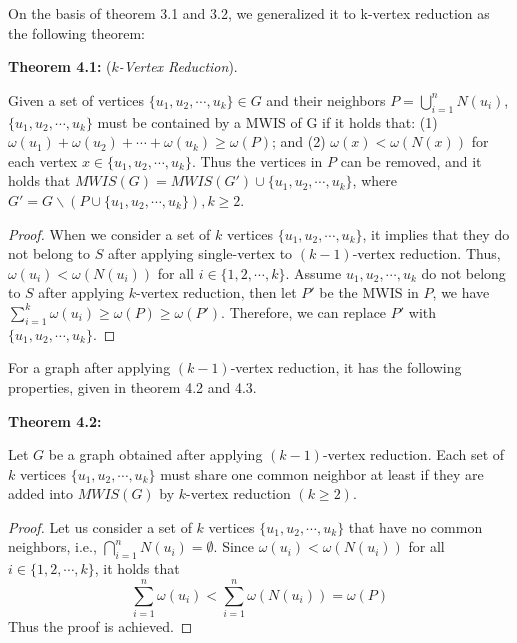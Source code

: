 \documentclass[sigconf, nonacm]{acmart}
\begin{document}
On the basis of theorem 3.1 and 3.2, we generalized it to k-vertex reduction as the following theorem:

\begin{framed}
\noindent\textbf{Theorem 4.1:} (\emph{$k$-Vertex Reduction}). 

Given a  set of vertices $\{u_1, u_2, \cdots, u_k\}\in G$ and their neighbors $P=\bigcup_{i=1}^nN(u_i)$, $\{u_1, u_2, \cdots, u_k\}$ must be contained by a MWIS of G if it holds that: (1) $\omega(u_1) + \omega(u_2) + \cdots + \omega(u_k) \geq \omega(P)$; and (2) $\omega(x) < \omega(N(x))$ for each vertex $x\in\{u_1, u_2, \cdots, u_k\}$. Thus the vertices in $P$ can be removed, and it holds that $MWIS(G) = MWIS(G')\cup\{u_1, u_2, \cdots, u_k\}$, where $G'=G\backslash (P\cup\{u_1, u_2, \cdots, u_k\}), k \geq 2$.
\end{framed}

\begin{proof}
When we consider a set of $k$ vertices $\{u_1, u_2, \cdots, u_k\}$, it implies that they do not belong to $S$ after applying single-vertex to $(k-1)$-vertex reduction. Thus, $\omega(u_i)<\omega(N(u_i))$ for all $i\in\{1,2,\cdots,k\}$. Assume $u_1, u_2, \cdots, u_k$ do not belong to $S$ after applying $k$-vertex reduction, then let $P'$ be the MWIS in $P$, we have $\sum_{i=1}^k\omega(u_i)\geq\omega(P)\geq\omega(P')$. Therefore, we can replace $P'$ with $\{u_1, u_2, \cdots, u_k\}$.
\end{proof}

For a graph after applying $(k-1)$-vertex reduction, it has the following properties, given in theorem 4.2 and 4.3.

\begin{framed}
\noindent\textbf{Theorem 4.2:}

Let $G$ be a graph obtained after applying $(k-1)$-vertex reduction. Each set of $k$ vertices $\{u_1, u_2, \cdots, u_k\}$ must share one common neighbor at least if they are added into $MWIS(G)$ by $k$-vertex reduction $(k\geq 2)$.
\end{framed}

\begin{proof}
Let us consider a set of $k$ vertices $\{u_1, u_2, \cdots, u_k\}$ that have no common neighbors, i.e., $\bigcap_{i=1}^nN(u_i)=\emptyset$. Since $\omega(u_i)<\omega(N(u_i))$ for all $i\in\{1,2,\cdots,k\}$, it holds that 
$$\sum_{i=1}^n\omega(u_i) < \sum_{i=1}^n\omega(N(u_i)) = \omega(P)$$ 
Thus the proof is achieved.
\end{proof}
\end{document}
